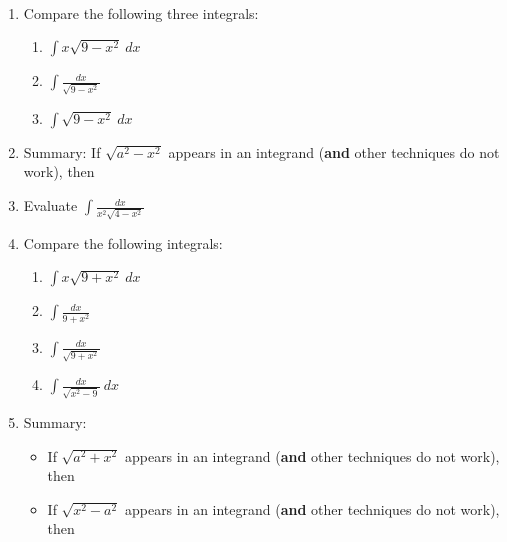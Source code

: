 \documentclass[11pt,fleqn]{article}
\begin{document}
\renewcommand{\headrulewidth}{0pt}
\newcommand{\blank}[1]{\rule{#1}{0.75pt}}
\newcommand{\bc}{\begin{center}}
\newcommand{\ec}{\end{center}}
\renewcommand{\d}{\displaystyle}

\vspace*{-0.7in}

\begin{center}
  \large
  \\
   
\end{center}

\begin{enumerate}
\item Compare the following three integrals:
	\begin{enumerate}
	\item $\displaystyle{\int x\sqrt{9-x^2}\: dx}$
	\vspace{1in}
	\item $\displaystyle{\int \frac{dx}{\sqrt{9-x^2}}}$
	\vspace{1in}
	\item $\displaystyle{\int  \sqrt{9-x^2}\: dx}$
	\vfill
	\end{enumerate}
\item Summary: If {\Large{$\sqrt{a^2-x^2}$}} appears in an integrand (\textbf{and} other techniques do not work), then\\
\vspace{.2in}
\item Evaluate $\displaystyle{\int \frac{dx}{x^2\sqrt{4-x^2}}}$
\vfill
\newpage
\item Compare the following integrals: 
\begin{enumerate}
	\item $\displaystyle{\int x\sqrt{9+x^2}\: dx}$
	\vspace{0.5in}
	\item $\displaystyle{\int \frac{dx}{{9+x^2}}}$
	\vspace{0.5in}
	\item $\displaystyle{\int \frac{dx}{\sqrt{9+x^2}}}$
	\vfill
	\item $\displaystyle{\int  \frac{dx}{\sqrt{x^2-9}}\: dx}$
	\vfill
	\end{enumerate}
\item Summary: 
	\begin{itemize}
	\item If {\Large{$\sqrt{a^2+x^2}$}} appears in an integrand (\textbf{and} other techniques do not work), then\\
	\vspace{.2in}
	\item If {\Large{$\sqrt{x^2-a^2}$}} appears in an integrand (\textbf{and} other techniques do not work), then\\
	\vspace{.2in}
	\end{itemize}


\end{enumerate}
\end{document}
